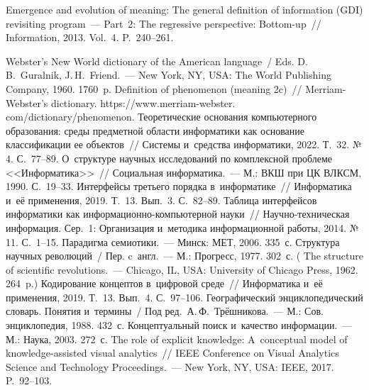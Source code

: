 \begin{multicols}{2}
{{\begin{thebibliography}{99}
Emergence and evolution of meaning: The general definition of information (GDI) revisiting 
program~--- Part~2: The regressive perspective: Bottom-up~// Information, 2013. Vol.~4.  
P.~240--261.


Webster's New World dictionary of the American language~/
Eds. D.\,B.~Guralnik, J.\,H.~Friend.~--- New York, NY, USA: The World Publishing Company, 
1960. 1760~p.
Definition of phenomenon (meaning 2c)~//
Merriam-Webster's dictionary.  {\sf  
https://www.merriam-webster. com/dictionary/phenomenon}.
 Теоретические основания компьютерного образования: среды 
предметной об\-ласти информатики как основание классификации ее объектов~// Сис\-те\-мы 
и~средства информатики, 2022. Т.~32. №\,4. С.~77--89.
 О~структуре научных исследований по комплексной проб\-ле\-ме 
<<Информатика>>~// Социальная информатика.~--- М.: ВКШ при ЦК ВЛКСМ, 
1990. С.~19--33.
 Интерфейсы третьего порядка в~информатике~// Информатика и~её 
применения, 2019. Т.~13. Вып.~3. С.~82--89.
 Таблица интерфейсов информатики как  
ин\-фор\-ма\-ци\-он\-но-компью\-тер\-ной науки~// На\-уч\-но-тех\-ни\-че\-ская информация. 
Сер.~1: Организация и~методика информационной работы, 2014. №\,11. С.~1--15.
 Парадигма семиотики.~--- Минск: МЕТ, 2006. 335~с.
 Структура научных революций~/ Пер. c~англ.~--- М.: Прогресс, 1977. 302~с. 
( The structure of scientific revolutions.~--- Chicago, IL, USA: University of Chicago Press, 
1962. 264~p.)
 Кодирование концептов в~циф\-ро\-вой среде~// Информатика и~её 
применения, 2019. Т.~13. Вып.~4. С.~97--106.
Географический энциклопедический словарь. Понятия и~термины~/ Под ред.\ 
А.\,Ф.~Трёшникова.~--- М.: Сов. энциклопедия, 1988. 432~с.
 Концептуальный поиск и~качество информации.~--- М.: Наука, 2003. 
272~с.
 The role of 
explicit knowledge: A~conceptual model of knowledge-assisted visual analytics~// IEEE 
Conference on Visual Analytics Science and Technology Proceedings.~--- New York, NY, USA: 
IEEE, 2017. P.~92--103.

\end{thebibliography}

 }
 }

\end{multicols}


